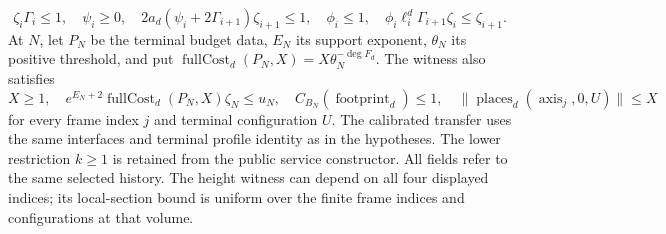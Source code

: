 \begin{theorem}
\[
 \zeta_i\Gamma_i\leq1,\quad \psi_i\geq0,\quad
 2a_d(\psi_i+2\Gamma_{i+1})\zeta_{i+1}\leq1,\quad
 \phi_i\leq1,\quad \phi_i\ell_i^d\Gamma_{i+1}\zeta_i\leq\zeta_{i+1}.
\]
At $N$, let $P_N$ be the terminal budget data, $E_N$ its support exponent, $\theta_N$ its positive threshold, and put $\operatorname{fullCost}_d(P_N,X)=X\theta_N^{-\deg F_d}$. The witness also satisfies
\[
 X\geq1,\quad e^{E_N+2}\operatorname{fullCost}_d(P_N,X)\zeta_N\leq u_N,\quad
 C_{B_N}(\operatorname{footprint}_d)\leq1,\quad
 \|\operatorname{places}_d(\operatorname{axis}_j,0,U)\|\leq X
\]
for every frame index $j$ and terminal configuration $U$. The calibrated transfer uses the same interfaces and terminal profile identity as in the hypotheses. The lower restriction $k\geq1$ is retained from the public service constructor. All fields refer to the same selected history. The height witness can depend on all four displayed indices; its local-section bound is uniform over the finite frame indices and configurations at that volume.
\end{theorem}

